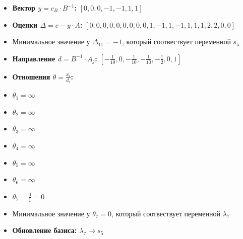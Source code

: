 \begin{itemize}
\begin{itemize}
$[0, 0, 0, 0, 0, 1, 1]$
\item \textbf{Вектор $y = c_B \cdot B^{-1}$:}
$[0, 0, 0, -1, -1, 1, 1]$
\item \textbf{Оценки $\Delta = c - y \cdot A$:}
$[0, 0, 0, 0, 0, 0, 0, 0, 0, 1, -1, 1, -1, 1, 1, 1, 2, 2, 0, 0]$
\item Минимальное значение у  $\Delta_{11} = -1$, который соотвествует переменной $s_5$
\item \textbf{Направление $d = B^{-1} \cdot A_j$:}
$[- \frac{1}{10}, 0, - \frac{1}{10}, - \frac{1}{10}, - \frac{1}{2}, 0, 1]$
\item \textbf{Отношения $\theta = \frac{x_i}{d_i}$:}
\item $\theta_{1} = \infty$
\item $\theta_{2} = \infty$
\item $\theta_{3} = \infty$
\item $\theta_{4} = \infty$
\item $\theta_{5} = \infty$
\item $\theta_{6} = \infty$
\item $\theta_{7} = \frac{0}{1} = 0$
\item Минимальное значение у  $\theta_{7} = 0$, который соотвествует переменной $\lambda_7$
\item \textbf{Обновление базиса: $\lambda_7 \rightarrow s_5$}
\end{itemize}
\newpage

\end{itemize}
